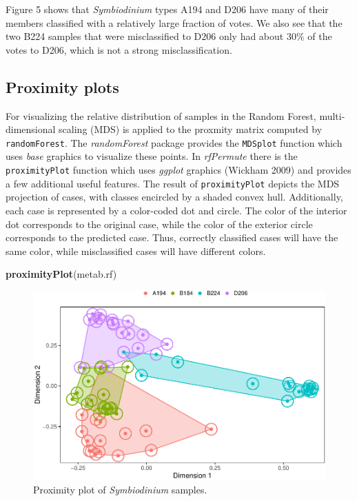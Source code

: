\documentclass[]{article}
\newenvironment{Shaded}{\begin{snugshade}}{\end{snugshade}}
\newcommand{\KeywordTok}[1]{\textcolor[rgb]{0.13,0.29,0.53}{\textbf{{#1}}}}
\newcommand{\NormalTok}[1]{{#1}}
\begin{document}
Figure 5 shows that \emph{Symbiodinium} types A194 and D206 have many of
their members classified with a relatively large fraction of votes. We
also see that the two B224 samples that were misclassified to D206 only
had about 30\% of the votes to D206, which is not a strong
misclassification.

\subsection{Proximity plots}\label{proximity-plots}

For visualizing the relative distribution of samples in the Random
Forest, multi-dimensional scaling (MDS) is applied to the proxmity
matrix computed by \texttt{randomForest}. The \emph{randomForest}
package provides the \texttt{MDSplot} function which uses \emph{base}
graphics to visualize these points. In \emph{rfPermute} there is the
\texttt{proximityPlot} function which uses \emph{ggplot} graphics
(Wickham 2009) and provides a few additional useful features. The result
of \texttt{proximityPlot} depicts the MDS projection of cases, with
classes encircled by a shaded convex hull. Additionally, each case is
represented by a color-coded dot and circle. The color of the interior
dot corresponds to the original case, while the color of the exterior
circle corresponds to the predicted case. Thus, correctly classified
cases will have the same color, while misclassified cases will have
different colors.

\begin{Shaded}
\begin{Highlighting}[]
\KeywordTok{proximityPlot}\NormalTok{(metab.rf)}
\end{Highlighting}
\end{Shaded}

\begin{figure}[htbp]
\centering
\includegraphics{rfPermute_ms_files/figure-latex/proximityPlot-1.pdf}
\caption{Proximity plot of \emph{Symbiodinium} samples.}
\end{figure}
\end{document}
